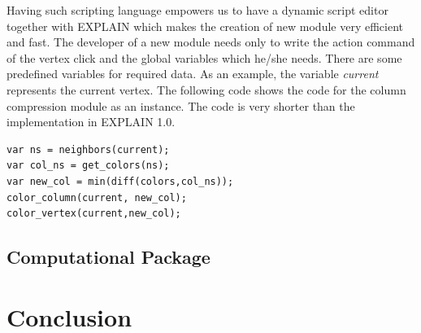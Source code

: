 \documentclass[12pt, oneside]{book}
\begin{document}
Having such scripting language empowers us to have a dynamic script editor 
together with EXPLAIN which makes the creation of new module very efficient and fast.
The developer of a new module needs only to write the action command of the vertex
click and the global variables which he/she needs.
There are some predefined variables for required data.
As an example, the variable \textit{current} represents the current vertex.
The following code shows the code for the column compression 
module as an instance. The code is very shorter than the implementation in EXPLAIN 1.0.
\begin{lstlisting}
var ns = neighbors(current);
var col_ns = get_colors(ns);
var new_col = min(diff(colors,col_ns));
color_column(current, new_col);
color_vertex(current,new_col);
\end{lstlisting}

\section{Computational Package}
\label{s.impl.graphtea}
\chapter{Conclusion}
\label{conc}


\end{document}
